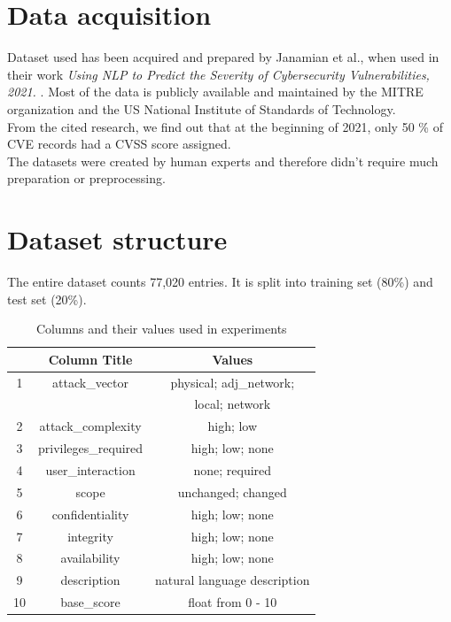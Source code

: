 \documentclass[times, utf8, zavrsni, english]{fer}
\begin{document}
\section{Data acquisition}
Dataset used has been acquired and prepared by Janamian et al., when used in their work \emph{Using NLP to Predict the Severity of Cybersecurity Vulnerabilities, 2021.} \citep{vulnerwatch}.
Most of the data is publicly available and maintained by the MITRE organization and the US National Institute of Standards of Technology. \\
From the cited research, we find out that at the beginning of 2021, only 50 \% of CVE records had a CVSS score assigned. \\
The datasets were created by human experts and therefore didn't require much preparation or preprocessing. 

\section{Dataset structure}
The entire dataset counts 77,020 entries. It is split into training set (80\%) and test set (20\%).

\begin{table}[h!]
	\centering
	\begin{tabular}{||c c c ||} 
		\hline
		 & Column Title & Values  \\ [0.5ex] 
		\hline\hline
		
		1 & attack\_vector & physical; adj\_network;   \\
		 & &  local; network \\
		2 & attack\_complexity & high; low  \\
		3 & privileges\_required & high; low; none  \\
		4 & user\_interaction & none; required \\ 
		5 & scope & unchanged; changed \\ 
		6 & confidentiality & high; low; none  \\
		7 & integrity & high; low; none  \\
		8 & availability & high; low; none  \\
		
		\hline\hline
		9 & description & natural language description \\
		10 & base\_score & float from 0 - 10 \\
		\hline
	\end{tabular}
\caption{Columns and their values used in experiments}
\label{table:1}
\end{table}
\end{document}
